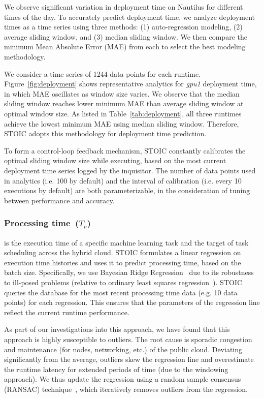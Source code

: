 We observe significant variation in deployment time on Nautilus for different times of the day. To accurately predict deployment time, we analyze deployment times as a time series using three methods: (1) auto-regression modeling, (2) average sliding window, and (3) median sliding window. We then compare the minimum 
Mean Absolute Error (MAE) from each to select the best modeling methodology. 

We consider a time series of 1244 data points for each runtime. Figure~\ref{fig:deployment} shows representative analytics for \textit{gpu1} deployment time, in which MAE oscillates as window size varies. We observe that the median sliding window reaches lower minimum MAE than average sliding window at optimal window size. As listed in Table~\ref{tab:deployment}, all three runtimes achieve the lowest minimum MAE using median sliding window. Therefore, STOIC adopts this methodology for deployment time prediction. 

To form a control-loop feedback mechanism, STOIC constantly calibrates the optimal sliding window size while executing, based on the most current deployment time series logged by the inquisitor. The number of data points used in analytics (i.e. 100 by default) and the interval of calibration (i.e. every 10 executions by default) are both parameterizable, in the consideration of tuning between performance and accuracy. 
 
\subsubsection{Processing time~($T_p$)} is the execution time of a specific machine learning task and the target of task scheduling across the hybrid cloud. STOIC formulates a linear regression on execution time histories and uses it to predict processing time, based on the batch size. Specifically, we use Bayesian Ridge Regression~\cite{ref:brr} due to its robustness to ill-posed problems (relative to ordinary least squares regression~\cite{ref:ols}). STOIC queries the database for the most recent processing time data (e.g. 10 data points) for each regression. This ensures that the parameters of the regression line reflect the current runtime performance.
 
As part of our investigations into this approach, we have found that this approach is highly susceptible to outliers. The root cause is sporadic congestion and maintenance (for nodes, networking, etc.) of the public cloud. Deviating significantly from the average, outliers skew the regression line and overestimate the runtime latency for extended periods of time (due to the windowing approach). We thus update the regression using a random sample consensus (RANSAC) technique~\cite{ref:ransac}, which iteratively removes outliers from the regression.
 
